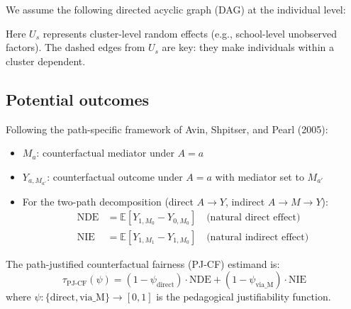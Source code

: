 \documentclass[11pt]{article}
\theoremstyle{plain}
\theoremstyle{definition}
\theoremstyle{remark}
\newcommand{\E}{\mathbb{E}}
\begin{document}
We assume the following directed acyclic graph (DAG) at the individual level:

\begin{center}
\end{center}

Here $U_s$ represents cluster-level random effects (e.g., school-level unobserved factors). The dashed edges from $U_s$ are key: they make individuals within a cluster dependent.

\subsection{Potential outcomes}

Following the path-specific framework of Avin, Shpitser, and Pearl (2005):
\begin{itemize}[itemsep=2pt]
    \item $M_a$: counterfactual mediator under $A = a$
    \item $Y_{a, M_{a'}}$: counterfactual outcome under $A = a$ with mediator set to $M_{a'}$
    \item For the two-path decomposition (direct $A \to Y$, indirect $A \to M \to Y$):
    \begin{align}
        \text{NDE} &= \E[Y_{1, M_0} - Y_{0, M_0}] \quad \text{(natural direct effect)} \\
        \text{NIE} &= \E[Y_{1, M_1} - Y_{1, M_0}] \quad \text{(natural indirect effect)}
    \end{align}
\end{itemize}

The path-justified counterfactual fairness (PJ-CF) estimand is:
\begin{equation}
    \tau_{\text{PJ-CF}}(\psi) = (1-\psi_{\text{direct}}) \cdot \text{NDE} + (1-\psi_{\text{via\_M}}) \cdot \text{NIE}
\end{equation}
where $\psi: \{\text{direct}, \text{via\_M}\} \to [0,1]$ is the pedagogical justifiability function.
\end{document}
